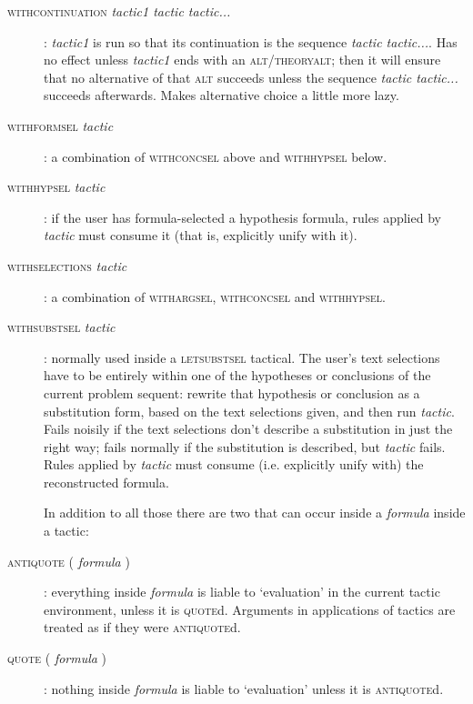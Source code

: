 \begin{description}
\item [\textsc{withcontinuation} \textit{tactic1 tactic tactic...}]: \textit{tactic1} is run so that its continuation is the sequence \textit{tactic tactic...}. Has no effect unless \textit{tactic1} ends with an \textsc{alt/theoryalt}; then it will ensure that no alternative of that \textsc{alt} succeeds unless the sequence \textit{tactic tactic...} succeeds afterwards. Makes alternative choice a little more lazy.


\item [\textsc{withformsel} \textit{tactic}]: a combination of \textsc{withconcsel} above and \textsc{withhypsel} below.


\item [\textsc{withhypsel} \textit{tactic}]: if the user has formula-selected a hypothesis formula, rules applied by \textit{tactic} must consume it (that is, explicitly unify with it).


\item [\textsc{withselections} \textit{tactic}]: a combination of \textsc{withargsel}, \textsc{withconcsel} and \textsc{withhypsel}.


\item [\textsc{withsubstsel} \textit{tactic}]: normally used inside a \textsc{letsubstsel} tactical. The user's text selections have to be entirely within one of the hypotheses or conclusions of the current problem sequent: rewrite that hypothesis or conclusion as a substitution form, based on the text selections given, and then run \textit{tactic}. Fails noisily if the text selections don't describe a substitution in just the right way; fails normally if the substitution is described, but \textit{tactic} fails. Rules applied by \textit{tactic} must consume (i.e. explicitly unify with) the reconstructed formula.


In addition to all those there are two that can occur inside a \textit{formula} inside a tactic:


\item [\textsc{antiquote} ( \textit{formula} )]: everything inside \textit{formula} is liable to `evaluation' in the current tactic environment, unless it is \textsc{quote}d. Arguments in applications of tactics are treated as if they were \textsc{antiquote}d.


\item [\textsc{quote} ( \textit{formula} )]: nothing inside \textit{formula} is liable to `evaluation' unless it is \textsc{antiquote}d.

\end{description}

